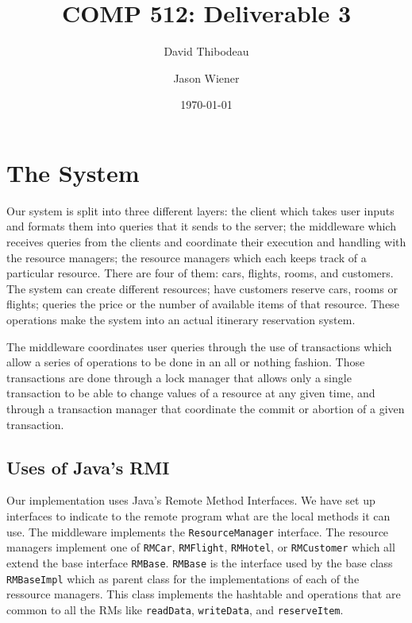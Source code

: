 \documentclass[12pt]{article}
\author{David Thibodeau \and Jason Wiener}
\title{COMP 512: Deliverable 3}
\date{\today}
\theoremstyle{plain}%
\theoremstyle{definition}
\theoremstyle{remark}
\newcommand{\java}[1]{{\lstinline!#1!}}
\begin{document}
\maketitle





\section{The System}

Our system is split into three different layers: the client which takes 
user inputs and formats them into queries that it sends to the server; 
the middleware which receives queries from the clients and coordinate 
their execution and handling with the resource managers; the resource 
managers which each keeps track of a particular resource. There are 
four of them: cars, flights, rooms, and customers. The system can create 
different resources; have customers reserve cars, rooms or flights; 
queries the price or the number of available items of that resource. 
These operations make the system into an actual itinerary reservation 
system.

The middleware coordinates user queries through the use of transactions 
which allow a series of operations to be done in an all or nothing 
fashion. Those transactions are done through a lock manager that allows 
only a single transaction to be able to change values of a resource at 
any given time, and through a transaction manager that coordinate the 
commit or abortion of a given transaction.

\subsection{Uses of Java's RMI}

Our implementation uses Java's Remote Method Interfaces. We have set up
interfaces to indicate to the remote program what are the local methods 
it can use. The middleware implements the \java{ResourceManager} interface. 
The resource managers implement one of \java{RMCar}, \java{RMFlight}, 
\java{RMHotel}, or \java{RMCustomer} which all extend the base interface 
\java{RMBase}. \java{RMBase} is the interface used by the base class
\java{RMBaseImpl} which as parent class for the implementations of
each of the ressource managers. This class implements the hashtable
and operations that are common to all the RMs like \java{readData},
\java{writeData}, and \java{reserveItem}.
\end{document}
